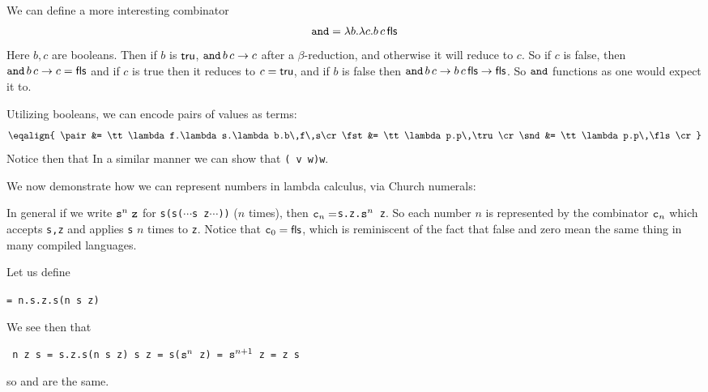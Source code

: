 We can define a more interesting combinator
$$ \and = \lambda b.\lambda c.b\,c\,\fls $$
Here $b,c$ are booleans.
Then if $b$ is ${\sf tru}$, $\and\,b\,c\to c$ after a $\beta$-reduction, and otherwise it will reduce to $c$.
So if $c$ is false, then $\and\,b\,c\to c=\fls$ and if $c$ is true then it reduces to $c={\sf tru}$, and if $b$ is false then $\and\,b\,c\to b\,c\,\fls\to\fls$.
So $\and$ functions as one would expect it to.

Utilizing booleans, we can encode pairs of values as terms:
$$ \eqalign{
    \pair &= \tt\lambda f.\lambda s.\lambda b.b\,f\,s\cr
    \fst &= \tt\lambda p.p\,\tru\cr
    \snd &= \tt\lambda p.p\,\fls\cr
} $$
Notice then that
In a similar manner we can show that {\tt \snd(\pair\ v w)\to w}.

We now demonstrate how we can represent numbers in lambda calculus, via Church numerals:

\medskip
\centerline{\vbox{}}
\medskip

In general if we write ${\tt s}^n\ \tt z$ for {\tt s(s($\cdots$s z$\cdots$))} ($n$ times), then $\cn n=${\tt\lambda s.\lambda z.${\tt s}^n$ z}.
So each number $n$ is represented by the combinator $\cn n$ which accepts {\tt s,z} and applies {\tt s} $n$ times to {\tt z}.
Notice that $\cn0=\fls$, which is reminiscent of the fact that false and zero mean the same thing in many compiled languages.

Let us define

\centerline{\tt \scc = \lambda n.\lambda s.\lambda z.s(n s z)}

We see then that

\centerline{\tt\scc\ \cn n z s = \lambda s.\lambda z.s(\cn n s z) s z = s(${\tt s}^n$ z) = ${\tt s}^{n+1}$ z =  z s}
so  and  are the same.

